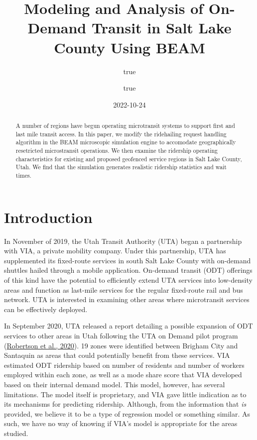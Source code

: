\documentclass[
]{report}
\title{Modeling and Analysis of On-Demand Transit in Salt Lake County Using BEAM}
\author{true \and true}
\date{2022-10-24}
\begin{document}
\maketitle
\begin{abstract}
A number of regions have begun operating microtransit systems to support first and last mile transit access. In this paper, we modify the ridehailing request handling algorithm in the BEAM microscopic simulation engine to accomodate geographically resetricted microstransit operations. We then examine the ridership operating characteristics for existing and proposed geofenced service regions in Salt Lake County, Utah. We find that the simulation generates realistic ridership statistics and wait times.
\end{abstract}

{
\setcounter{tocdepth}{1}
\tableofcontents
}
\hypertarget{introduction}{%
\chapter{Introduction}\label{introduction}}

In November of 2019, the Utah Transit Authority (UTA) began a partnership with VIA, a private mobility company. Under this partnership, UTA has supplemented its fixed-route services in south Salt Lake County with on-demand shuttles hailed through a mobile application. On-demand transit (ODT) offerings of this kind have the potential to efficiently extend UTA services into low-density areas and function as last-mile services for the regular fixed-route rail and bus network. UTA is interested in examining other areas where microtransit services can be effectively deployed.

In September 2020, UTA released a report detailing a possible expansion of ODT services to other areas in Utah following the UTA on Demand pilot program (\protect\hyperlink{ref-UTAreport}{Robertson et al., 2020}). 19 zones were identified between Brigham City and Santaquin as areas that could potentially benefit from these services. VIA estimated ODT ridership based on number of residents and number of workers employed within each zone, as well as a mode share score that VIA developed based on their internal demand model. This model, however, has several limitations. The model itself is proprietary, and VIA gave little indication as to its mechanisms for predicting ridership. Although, from the information that \emph{is} provided, we believe it to be a type of regression model or something similar. As such, we have no way of knowing if VIA's model is appropriate for the areas studied.
\end{document}
